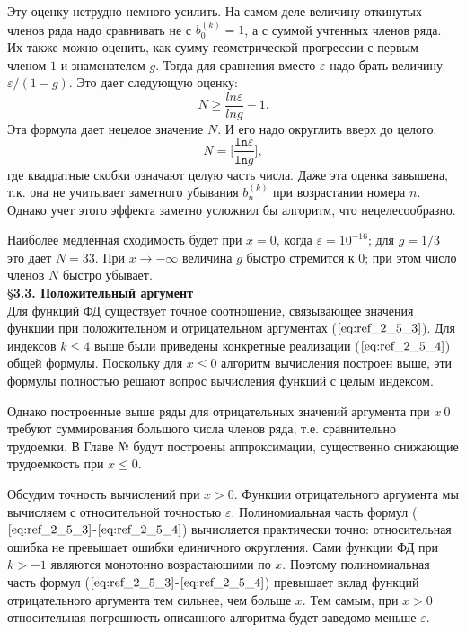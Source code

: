 Эту оценку нетрудно немного усилить. На самом деле величину откинутых
членов ряда надо сравнивать не с $b_0^{(k)}=1$, а с суммой учтенных членов ряда. Их
также можно оценить, как сумму геометрической прогрессии с первым членом
$1$ и знаменателем $g$. Тогда для сравнения вместо $\varepsilon$ надо брать величину
$\varepsilon/(1-g)$. Это дает следующую оценку:
\begin{equation}
N \geqslant \frac{ln \varepsilon}{ln g} - 1.
\label{eq:ref_3_2_4}
\end{equation}
Эта формула дает нецелое значение $N$. И его надо округлить вверх до целого:
\begin{equation}
N = \Bigg[\frac{\texttt{ln} \varepsilon}{\texttt{ln} g}\Bigg],
\label{eq:ref_3_2_5}
\end{equation}
где квадратные скобки означают целую часть числа. Даже эта оценка завышена,
т.к. она не учитывает заметного убывания $b_n^{(k)}$ при возрастании номера $n$.
Однако учет этого эффекта заметно усложнил бы алгоритм, что
нецелесообразно.

Наиболее медленная сходимость будет при $x = 0$, когда $\varepsilon = 10^{-16}$; для
$g = 1/3$ это дает $N = 33$. При $x \to -\infty$ величина $g$ быстро стремится к $0$; при
этом число членов $N$ быстро убывает.
\\

\S \textbf{3.3. Положительный аргумент}
\\

Для функций ФД существует точное соотношение, связывающее значения функции при положительном и
отрицательном аргументах ($\ref{eq:ref_2_5_3}$). Для индексов $k \leqslant 4$ выше были приведены конкретные реализации ($\ref{eq:ref_2_5_4}$) общей формулы. Поскольку для $x \leqslant 0$ алгоритм вычисления построен выше, эти формулы полностью решают вопрос вычисления функций с целым индексом.

Однако построенные выше ряды для отрицательных значений аргумента при $x~0$ требуют суммирования большого числа членов ряда, т.е. сравнительно трудоемки. В Главе № будут построены аппроксимации, существенно снижающие трудоемкость при $x \leqslant 0$.

Обсудим точность вычислений при $x > 0$. Функции отрицательного аргумента мы вычисляем с относительной точностью $\varepsilon$. Полиномиальная часть формул ($\ref{eq:ref_2_5_3}$-$\ref{eq:ref_2_5_4}$) вычисляется практически точно: относительная ошибка не превышает ошибки единичного округления. Сами функции ФД при $k > -1$ являются монотонно возрастаюшими по $x$. Поэтому полиномиальная часть формул ($\ref{eq:ref_2_5_3}$-$\ref{eq:ref_2_5_4}$) превышает вклад функций отрицательного аргумента тем сильнее, чем больше $x$. Тем самым, при $x>0$ относительная погрешность описанного алгоритма будет заведомо меньше $\varepsilon$.
